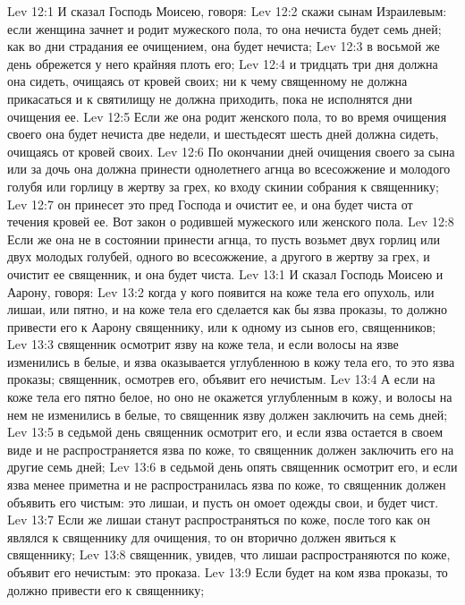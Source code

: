 \vs Lev 12:1 И сказал Господь Моисею, говоря:
\vs Lev 12:2 скажи сынам Израилевым: если женщина зачнет и родит  мужеского пола, то она нечиста будет семь дней; как во дни страдания ее очищением, она будет нечиста;
\vs Lev 12:3 в восьмой же день обрежется у него крайняя плоть его;
\vs Lev 12:4 и тридцать три дня должна она сидеть, очищаясь от кровей своих; ни к чему священному не должна прикасаться и к святилищу не должна приходить, пока не исполнятся дни очищения ее.
\vs Lev 12:5 Если же она родит  женского пола, то во время очищения своего она будет нечиста две недели, и шестьдесят шесть дней должна сидеть, очищаясь от кровей своих.
\vs Lev 12:6 По окончании дней очищения своего за сына или за дочь она должна принести однолетнего агнца во всесожжение и молодого голубя или горлицу в жертву за грех, ко входу скинии собрания к священнику;
\vs Lev 12:7 он принесет это пред Господа и очистит ее, и она будет чиста от течения кровей ее. Вот закон о родившей  мужеского или женского пола.
\vs Lev 12:8 Если же она не в состоянии принести агнца, то пусть возьмет двух горлиц или двух молодых голубей, одного во всесожжение, а другого в жертву за грех, и очистит ее священник, и она будет чиста.
\vs Lev 13:1 И сказал Господь Моисею и Аарону, говоря:
\vs Lev 13:2 когда у кого появится на коже тела его опухоль, или лишаи, или пятно, и на коже тела его сделается как бы язва проказы, то должно привести его к Аарону священнику, или к одному из сынов его, священников;
\vs Lev 13:3 священник осмотрит язву на коже тела, и если волосы на язве изменились в белые, и язва оказывается углубленною в кожу тела его, то это язва проказы; священник, осмотрев его, объявит его нечистым.
\vs Lev 13:4 А если на коже тела его пятно белое, но оно не окажется углубленным в кожу, и волосы на нем не изменились в белые, то священник  язву должен заключить на семь дней;
\vs Lev 13:5 в седьмой день священник осмотрит его, и если язва остается в своем виде и не распространяется язва по коже, то священник должен заключить его на другие семь дней;
\vs Lev 13:6 в седьмой день опять священник осмотрит его, и если язва менее приметна и не распространилась язва по коже, то священник должен объявить его чистым: это лишаи, и пусть он омоет одежды свои, и будет чист.
\vs Lev 13:7 Если же лишаи станут распространяться по коже, после того как он являлся к священнику для очищения, то он вторично должен явиться к священнику;
\vs Lev 13:8 священник, увидев, что лишаи распространяются по коже, объявит его нечистым: это проказа.
\rsbpar\vs Lev 13:9 Если будет на ком язва проказы, то должно привести его к священнику;
